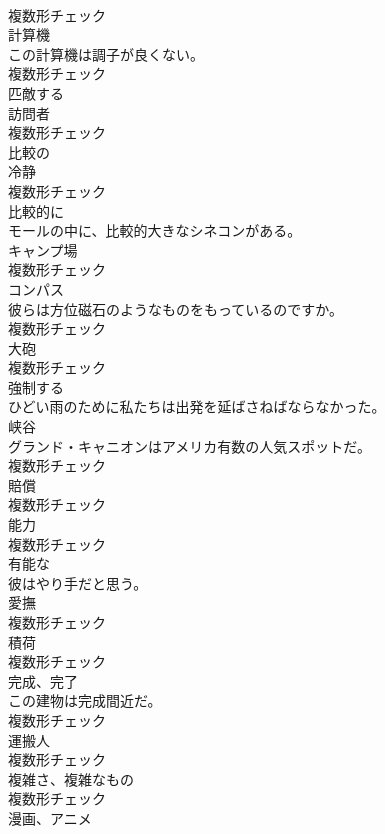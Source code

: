 \documentclass[8pt]{extreport}
\begin{document}
\begin{CJK}{UTF8}{min}
\\	複数形チェック
\\	[名詞]	計算機	
\\	この計算機は調子が良くない。	
\\	複数形チェック
\\	[形容詞]	匹敵する	
\\	[名詞]	訪問者	
\\	複数形チェック
\\	[形容詞]	比較の	
\\	[名詞]	冷静	
\\	複数形チェック
\\	[副詞]	比較的に	
\\	モールの中に、比較的大きなシネコンがある。	
\\	[名詞]	キャンプ場	
\\	複数形チェック
\\	[名詞]	コンパス	
\\	彼らは方位磁石のようなものをもっているのですか。	
\\	複数形チェック
\\	[名詞]	大砲	
\\	複数形チェック
\\	[動詞]	強制する	
\\	ひどい雨のために私たちは出発を延ばさねばならなかった。	
\\	[名詞]	峡谷	
\\	グランド・キャニオンはアメリカ有数の人気スポットだ。	
\\	複数形チェック
\\	[名詞]	賠償	
\\	複数形チェック
\\	[名詞]	能力	
\\	複数形チェック
\\	[形容詞]	有能な	
\\	彼はやり手だと思う。	
\\	[名詞]	愛撫	
\\	複数形チェック
\\	[名詞]	積荷	
\\	複数形チェック
\\	[名詞]	完成、完了	
\\	この建物は完成間近だ。	
\\	複数形チェック
\\	[名詞]	運搬人	
\\	複数形チェック
\\	[名詞]	複雑さ、複雑なもの	
\\	複数形チェック
\\	[名詞]	漫画、アニメ	

\end{CJK}
\end{document}
